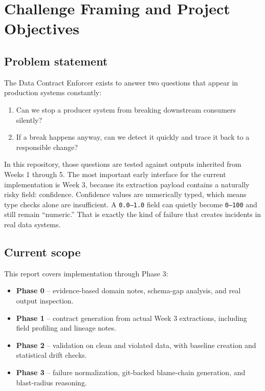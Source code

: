 \documentclass[11pt]{report}
\begin{document}
\clearpage
\chapter{Challenge Framing and Project Objectives}

\section{Problem statement}
The Data Contract Enforcer exists to answer two questions that appear in production systems constantly:

\begin{enumerate}[leftmargin=1.6em]
  \item Can we stop a producer system from breaking downstream consumers silently?
  \item If a break happens anyway, can we detect it quickly and trace it back to a responsible change?
\end{enumerate}

In this repository, those questions are tested against outputs inherited from Weeks 1 through 5. The most important early interface for the current implementation is Week 3, because its extraction payload contains a naturally risky field: confidence. Confidence values are numerically typed, which means type checks alone are insufficient. A \texttt{0.0--1.0} field can quietly become \texttt{0--100} and still remain ``numeric.'' That is exactly the kind of failure that creates incidents in real data systems.

\section{Current scope}
This report covers implementation through Phase 3:

\begin{itemize}[leftmargin=1.5em]
  \item \textbf{Phase 0} -- evidence-based domain notes, schema-gap analysis, and real output inspection.
  \item \textbf{Phase 1} -- contract generation from actual Week 3 extractions, including field profiling and lineage notes.
  \item \textbf{Phase 2} -- validation on clean and violated data, with baseline creation and statistical drift checks.
  \item \textbf{Phase 3} -- failure normalization, git-backed blame-chain generation, and blast-radius reasoning.
\end{itemize}
\end{document}

